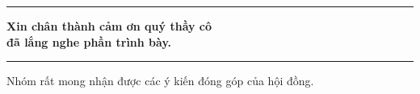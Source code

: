 \begin{frame}[plain]
  \vfill
  \centering
  {\color{vnSteel!45}\rule{0.55\textwidth}{0.8pt}\par}
  \vspace{0.7em}
  {\Large\bfseries\color{vnNavy} Xin chân thành cảm ơn quý thầy cô\\[4pt]
   đã lắng nghe phần trình bày.\par}
  \vspace{0.7em}
  {\color{vnSteel!45}\rule{0.55\textwidth}{0.8pt}\par}

  \vspace{1.2em}
  {\small\color{vnCite} Nhóm rất mong nhận được các ý kiến đóng góp của hội đồng.\par}
  \vfill
\end{frame}
